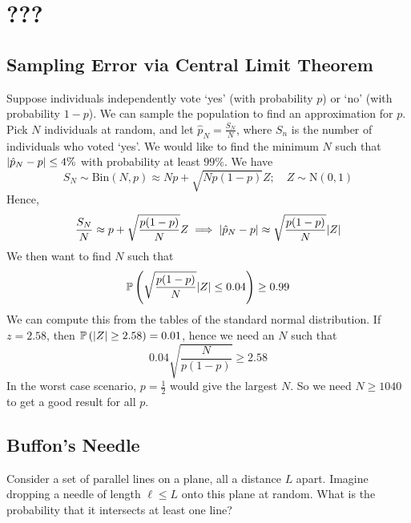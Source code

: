 \documentclass{article}
\begin{document}
\section{???}
\subsection{Sampling Error via Central Limit Theorem}
Suppose individuals independently vote `yes' (with probability $p$) or `no' (with probability $1-p$). We can sample the population to find an approximation for $p$. Pick $N$ individuals at random, and let $\hat{p}_N = \frac{S_N}{N}$, where $S_n$ is the number of individuals who voted `yes'. We would like to find the minimum $N$ such that $\abs{\hat{p}_N - p} \leq 4\%$ with probability at least $99\%$. We have
\[ S_N \sim \mathrm{Bin}(N, p) \approx Np + \sqrt{Np(1-p)}Z;\quad Z \sim \mathrm{N}(0, 1) \]
Hence,
\[ \frac{S_N}{N} \approx p + \sqrt{\frac{p(1-p)}{N}}Z \implies \abs{\hat{p}_N - p} \approx \sqrt{\frac{p(1-p)}{N}}\abs{Z} \]
We then want to find $N$ such that
\[ \mathbb{P}\left({\sqrt{\frac{p(1-p)}{N}}\abs{Z} \leq 0.04}\right) \geq 0.99 \]
We can compute this from the tables of the standard normal distribution. If $z = 2.58$, then $\mathbb{P}\left({\abs{Z} \geq 2.58}\right) = 0.01$, hence we need an $N$ such that
\[ 0.04 \sqrt{\frac{N}{p(1-p)}} \geq 2.58 \]
In the worst case scenario, $p = \frac{1}{2}$ would give the largest $N$. So we need $N \geq 1040$ to get a good result for all $p$.

\subsection{Buffon's Needle}
Consider a set of parallel lines on a plane, all a distance $L$ apart. Imagine dropping a needle of length $\ell \leq L$ onto this plane at random. What is the probability that it intersects at least one line?
\end{document}
